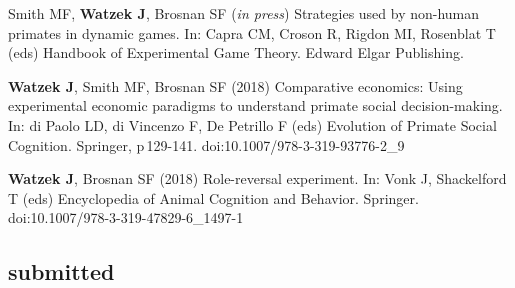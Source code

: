 \documentclass[]{friggeri-cv}
\begin{document}
\begin{enumerate}[resume, label={[\,\arabic*\,]}]
  \item Smith MF, \textbf{Watzek J}, Brosnan SF (\emph{in press}) Strategies used by non-human primates in dynamic games. In: Capra CM, Croson R, Rigdon MI, Rosenblat T (eds) Handbook of Experimental Game Theory. Edward Elgar Publishing.
  \item \textbf{Watzek J}, Smith MF, Brosnan SF (2018) Comparative economics: Using experimental economic paradigms to understand primate social decision-making. In: di Paolo LD, di Vincenzo F, De Petrillo F (eds) Evolution of Primate Social Cognition. Springer, p\,129-141. doi:10.1007/978-3-319-93776-2\_9
  \item \textbf{Watzek J}, Brosnan SF (2018) Role-reversal experiment. In: Vonk J, Shackelford T (eds) Encyclopedia of Animal Cognition and Behavior. Springer. doi:10.1007/978-3-319-47829-6\_1497-1
\end{enumerate}


\subsection{submitted}
\end{document}
